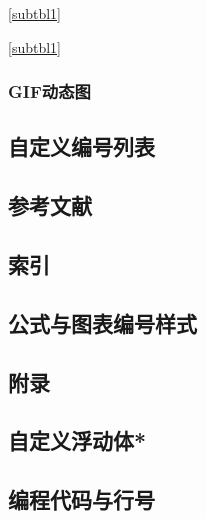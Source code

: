 \documentclass{ctexart}
\begin{document}
            \thesubtable\par
            \ref{subtbl1}\par
            \autoref{subtbl1}
            
        \subsubsection{GIF动态图}
    \subsection{自定义编号列表}
            
    \subsection{参考文献}

    \subsection{索引}
        
    \subsection{公式与图表编号样式}
    \subsection{附录}
    \subsection{自定义浮动体*}
    \subsection{编程代码与行号}




            \theendnotes
\end{document}
